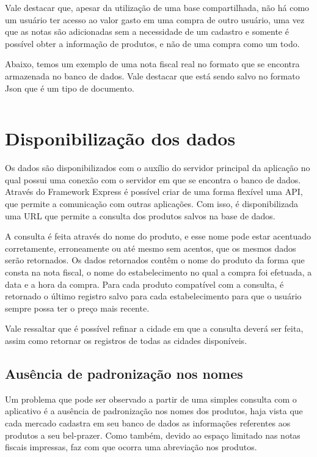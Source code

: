 Vale destacar que, apesar da utilização de uma base compartilhada, não há como um usuário ter acesso ao valor gasto em uma compra de outro usuário, uma vez que as notas são adicionadas sem a necessidade de um cadastro e somente é possível obter a informação de produtos, e não de uma compra como um todo.

Abaixo, temos um exemplo de uma nota fiscal real no formato que se encontra armazenada no banco de dados. Vale destacar que está sendo salvo no formato Json que é um tipo de documento.

\inputminted{octave}{exemplo-nfce.json}

\newpage
\section{Disponibilização dos dados}



Os dados são disponibilizados com o auxílio do servidor principal da aplicação no qual possui uma conexão com o servidor em que se encontra o banco de dados. Através do Framework Express é possível criar de uma forma flexível uma API, que permite a comunicação com outras aplicações. Com isso, é disponibilizada uma URL que permite a consulta dos produtos salvos na base de dados.

A consulta é feita através do nome do produto, e esse nome pode estar acentuado corretamente, erroneamente ou até mesmo sem acentos, que os mesmos dados serão retornados. Os dados retornados contêm o nome do produto da forma que consta na nota fiscal, o nome do estabelecimento no qual a compra foi efetuada, a data e a hora da compra. Para cada produto compatível com a consulta, é retornado o último registro salvo para cada estabelecimento para que o usuário sempre possa ter o preço mais recente.

Vale ressaltar que é possível refinar a cidade em que a consulta deverá ser feita, assim como retornar os registros de todas as cidades disponíveis.

\subsection{Ausência de padronização nos nomes}

Um problema que pode ser observado a partir de uma simples consulta com o aplicativo é a ausência de padronização nos nomes dos produtos, haja vista que cada mercado cadastra em seu banco de dados as informações referentes aos produtos a seu bel-prazer. Como também, devido ao espaço limitado nas notas fiscais impressas, faz com que ocorra uma abreviação nos produtos.

